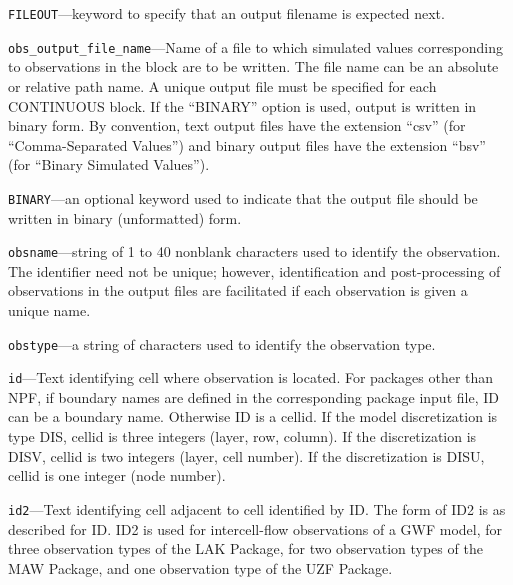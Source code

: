 \begin{description}
\item \texttt{FILEOUT}---keyword to specify that an output filename is expected next.

\item \texttt{obs\_output\_file\_name}---Name of a file to which simulated values corresponding to observations in the block are to be written. The file name can be an absolute or relative path name. A unique output file must be specified for each CONTINUOUS block. If the ``BINARY'' option is used, output is written in binary form. By convention, text output files have the extension ``csv'' (for ``Comma-Separated Values'') and binary output files have the extension ``bsv'' (for ``Binary Simulated Values'').

\item \texttt{BINARY}---an optional keyword used to indicate that the output file should be written in binary (unformatted) form.

\item \texttt{obsname}---string of 1 to 40 nonblank characters used to identify the observation. The identifier need not be unique; however, identification and post-processing of observations in the output files are facilitated if each observation is given a unique name.

\item \texttt{obstype}---a string of characters used to identify the observation type.

\item \texttt{id}---Text identifying cell where observation is located. For packages other than NPF, if boundary names are defined in the corresponding package input file, ID can be a boundary name. Otherwise ID is a cellid. If the model discretization is type DIS, cellid is three integers (layer, row, column). If the discretization is DISV, cellid is two integers (layer, cell number). If the discretization is DISU, cellid is one integer (node number).

\item \texttt{id2}---Text identifying cell adjacent to cell identified by ID. The form of ID2 is as described for ID. ID2 is used for intercell-flow observations of a GWF model, for three observation types of the LAK Package, for two observation types of the MAW Package, and one observation type of the UZF Package.

\end{description}

